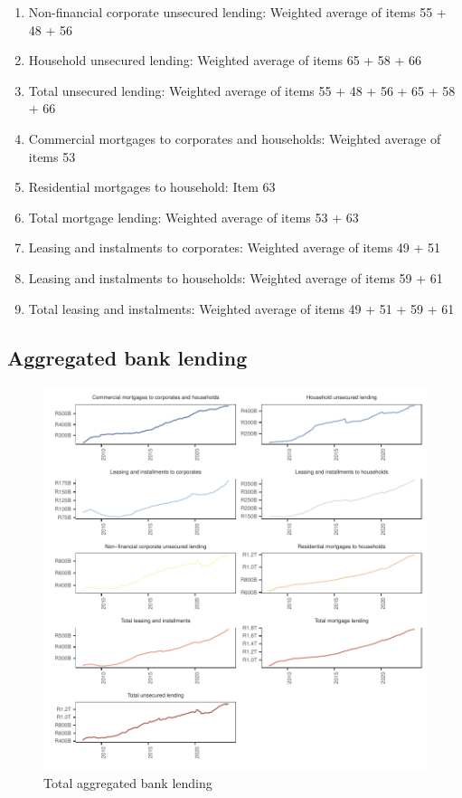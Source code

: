 \documentclass[
  letterpaper,
  DIV=11,
  numbers=noendperiod]{scrartcl}
\providecommand{\tightlist}{%
  \setlength{\itemsep}{0pt}\setlength{\parskip}{0pt}}\usepackage{longtable,booktabs,array}
\begin{document}
\begin{enumerate}
\def\labelenumi{\alph{enumi}.}
\tightlist
\item
  Non-financial corporate unsecured lending: Weighted average of items
  55 + 48 + 56
\item
  Household unsecured lending: Weighted average of items 65 + 58 + 66
\item
  Total unsecured lending: Weighted average of items 55 + 48 + 56 + 65 +
  58 + 66
\item
  Commercial mortgages to corporates and households: Weighted average of
  items 53
\item
  Residential mortgages to household: Item 63
\item
  Total mortgage lending: Weighted average of items 53 + 63
\item
  Leasing and instalments to corporates: Weighted average of items 49 +
  51
\item
  Leasing and instalments to households: Weighted average of items 59 +
  61
\item
  Total leasing and instalments: Weighted average of items 49 + 51 + 59
  + 61
\end{enumerate}

\newpage

\hypertarget{aggregated-bank-lending}{%
\subsection{Aggregated bank lending}\label{aggregated-bank-lending}}

\begin{figure}[H]

{\centering \includegraphics{UP_paper_files/figure-pdf/fig-bank_lending-1.pdf}

}

\caption{\label{fig-bank_lending}Total aggregated bank lending}

\end{figure}
\end{document}
